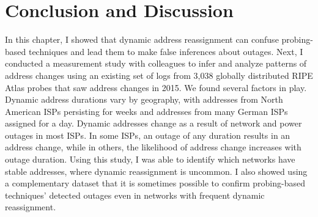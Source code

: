 
\section{Conclusion and Discussion}




In this chapter, I showed that dynamic address reassignment can confuse
probing-based techniques and lead them to make false inferences about
outages. Next, I conducted a measurement study with colleagues to infer and analyze patterns of address changes using
an existing set of logs from 3,038 globally distributed RIPE Atlas probes that saw address changes in
2015. We found several factors in play.
Dynamic address durations vary by geography, with addresses from North
American ISPs persisting for weeks and addresses from
many German ISPs assigned for a day. Dynamic addresses change as a
result of network and power outages in most ISPs. In some ISPs, an
outage of any duration results in an address change, while in others, the
likelihood of address change increases with outage duration. Using
this study, I was able to identify which networks have stable
addresses, where dynamic reassignment is uncommon. I also showed using a complementary dataset that it is sometimes possible
to confirm probing-based techniques' detected outages even in
networks with frequent dynamic reassignment. %



